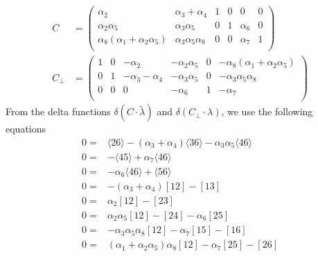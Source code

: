 \documentclass[a4paper,12pt]{article}
\begin{document}
\begin{equation}
	\begin{aligned}
		C&=\left(
		\begin{array}{cccccc}
			\alpha_2 & \alpha_3 + \alpha_4 & 1 & 0 & 0 & 0 \\
		\alpha_2 \alpha_5 & \alpha_3 \alpha_5 & 0 & 1 & \alpha_6 & 0 \\
		\alpha_8 (\alpha_1+\alpha_2 \alpha_5) & \alpha_3 \alpha_5
		\alpha_8 & 0 & 0 & \alpha_7 & 1 \\
		\end{array}
		\right)\\
		C_\perp&=
		\left(
		\begin{array}{cccccc}
			1 & 0 & -\alpha_2 & -\alpha_2 \alpha_5 & 0 & -\alpha_8 (\alpha
				_1+\alpha_2 \alpha_5) \\
			0 & 1 & -\alpha_3-\alpha_4 & -\alpha_3 \alpha_5 & 0 & -\alpha_3
			\alpha_5 \alpha_8 \\
			0 & 0 & 0 & -\alpha_6 & 1 & -\alpha_7 \\
		\end{array}
		\right)
	\end{aligned}
\end{equation}
From the delta functions $\delta(C\cdot \tilde \lambda)$ and $\delta(C_\perp \cdot \lambda)$, we use the following equations
\begin{equation}
	\begin{aligned}
		0=&\langle 2 6 \rangle - (\alpha_{3} + \alpha_{4}) \langle 3 6 \rangle - \alpha_{3} \alpha_{5} \langle 4 6 \rangle
		\\
		0=&-\langle 4 5 \rangle + \alpha_{7} \langle 4 6 \rangle
		\\
	0=&	-\alpha_{6} \langle 4 6 \rangle + \langle 5 6 \rangle
		\\
	0=&	-(\alpha_{3} + \alpha_{4}) \left[ 1 2 \right] - \left[ 1 3 \right]
		\\
	0=&	\alpha_{2} \left[ 1 2 \right] - \left[ 2 3 \right]
		\\
	0=&	\alpha_{2} \alpha_{5} \left[ 1 2 \right] - \left[ 2 4 \right] - \alpha_{6} \left[ 2 5 \right]
		\\
	0=&	-\alpha_{3} \alpha_{5} \alpha_{8} \left[ 1 2 \right] - \alpha_{7} \left[ 1 5 \right] - \left[ 1 6 \right]
		\\
	0=&	(\alpha_{1} + \alpha_{2} \alpha_{5}) \alpha_{8} \left[ 1 2 \right] - \alpha_{7} \left[ 2 5 \right] - \left[ 2 6 \right]
	\end{aligned}
\end{equation}
\end{document}
